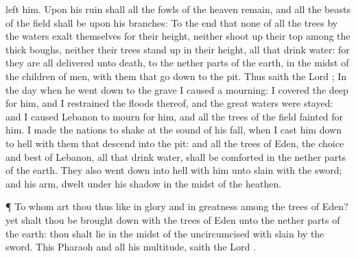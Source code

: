 {left him.
Upon his
ruin shall all the
fowls of the
heaven
remain, and all the
beasts of the
field shall be upon his
branches:
To the end that none of all the
trees by the
waters
exalt themselves for their
height, neither shoot
up their
top among the thick
boughs, neither their
trees stand
up in their
height, all that
drink
water: for they are all
delivered unto
death, to the nether
parts of the
earth, in the
midst of the
children of
men, with them that go
down to the
pit.
Thus
saith the
Lord
{}; In the
day when he went
down to the
grave I caused a
mourning: I
covered the
deep for him, and I
restrained the
floods thereof, and the
great
waters were
stayed: and I caused
Lebanon to
mourn for him, and all the
trees of the
field
fainted for him.
I made the
nations to
shake at the
sound of his
fall, when I cast him
down to
hell with them that
descend into the
pit: and all the
trees of
Eden, the
choice and
best of
Lebanon, all that
drink
water, shall be
comforted in the nether
parts of the
earth.
They also went
down into
hell with him unto
{}
slain with the
sword; and
{} his
arm,
{}
dwelt under his
shadow in the
midst of the
heathen.
\par }{\PP {}¶ To whom art thou thus
like in
glory and in
greatness among the
trees of
Eden? yet shalt thou be brought
down with the
trees of
Eden unto the nether
parts of the
earth: thou shalt
lie in the
midst of the
uncircumcised with
{}
slain by the
sword. This
{}
Pharaoh and all his
multitude,
saith the
Lord
{}.

}
